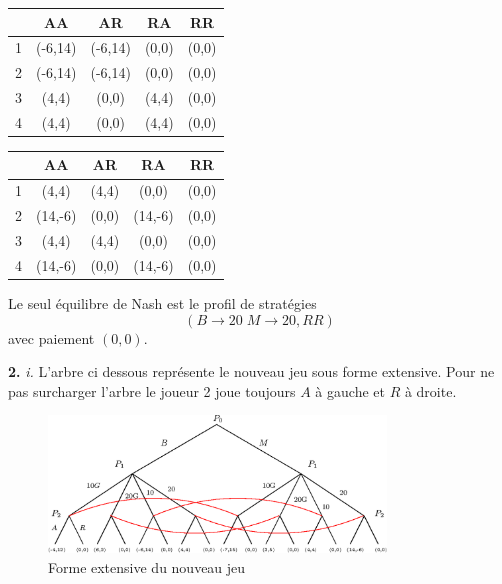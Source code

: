 \documentclass[12pt]{article}
\begin{document}
\begin{minipage}{0.4\textwidth}
        \centering
        \begin{tabular}{|c|c|c|c|c|}
                \hline
                & AA & AR & RA & RR \\ 
                \hline
                1 & (-6,14) & (-6,14) & (0,0) & (0,0) \\
                \hline
                2 & (-6,14) & (-6,14) & (0,0) & (0,0) \\
                \hline
                3 & (4,4) & (0,0) & (4,4) & (0,0) \\
                \hline
                4 & (4,4) & (0,0) & (4,4) & (0,0) \\
                \hline
        \end{tabular}
\end{minipage}
\hfill
\begin{minipage}{0.4\textwidth}
        \centering
        \begin{tabular}{|c|c|c|c|c|}
                \hline
                & AA & AR & RA & RR \\ 
                \hline
                1 & (4,4) & (4,4) & (0,0) & (0,0) \\
                \hline
                2 & (14,-6) & (0,0) & (14,-6) & (0,0) \\
                \hline
                3 & (4,4) & (4,4) & (0,0) & (0,0) \\
                \hline
                4 & (14,-6) & (0,0) & (14,-6) & (0,0) \\
                \hline
        \end{tabular}
\end{minipage}

Le seul équilibre de Nash est le profil de stratégies \[
        (B \to 20 \; M \to 20, RR)
\] avec paiement $(0,0)$.

\bigskip

\textbf{2.} \textit{i.} L'arbre ci dessous représente le nouveau jeu sous forme extensive. Pour ne pas surcharger l'arbre le joueur 2 joue toujours $A$ à gauche et $R$ à droite.

\begin{figure}[htpb]
        \centering
        \includegraphics[width=0.8\textwidth]{ext2_2.eps}
        \caption{Forme extensive du nouveau jeu}
        \label{fig:ext2}
\end{figure}
\end{document}
